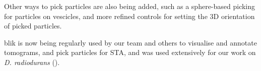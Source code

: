 Other ways to pick particles are also being added, such as a sphere-based picking for particles on vescicles, and more refined controls for setting the 3D orientation of picked particles.

blik is now being regularly used by our team and others to visualise and annotate tomograms, and pick particles for STA, and was used extensively for our work on \textit{D. radiodurans} ().

